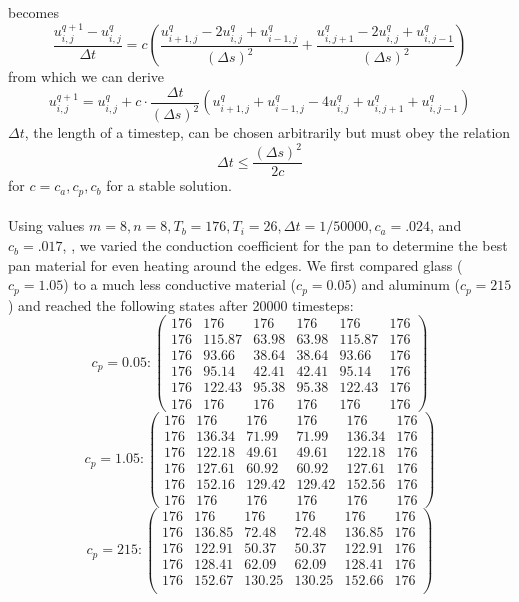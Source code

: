 \documentclass[11pt, fullpage]{article}
\begin{document}
\begin{enumerate}
becomes
\[\dfrac{u_{i,j}^{q+1} - u_{i,j}^q}{\Delta t} = c  \left(\dfrac{u_{i+1,j}^q - 2u_{i,j}^q + u_{i-1,j}^q}{(\Delta s)^2} + \dfrac{u_{i,j+1}^q - 2u_{i,j}^q + u_{i,j-1}^q}{(\Delta s)^2}\right)\]
from which we can derive
\[u_{i,j}^{q+1} = u_{i,j}^q + c \cdot \frac{\Delta t}{(\Delta s)^2} \left(u_{i+1,j}^q + u_{i-1,j}^q - 4u_{i,j}^q + u_{i,j+1}^q + u_{i,j-1}^q \right)\]
$\Delta t$, the length of a timestep, can be chosen arbitrarily but must obey the relation
\[\Delta t \leq \frac{(\Delta s)^2}{2c}\]
for $c = c_a,c_p,c_b$ for a stable solution.\\
\\
Using values $m = 8, n=8, T_b = 176, T_i = 26, \Delta t = 1/50000, c_a = .024$, and $c_b = .017$, , we varied the conduction coefficient for the pan to determine the best pan material for even heating around the edges.  We first compared glass ($c_p = 1.05$) to a much less conductive material ($c_p = 0.05$) and aluminum ($c_p = 215$) and reached the following states after 20000 timesteps:
\[c_p = 0.05: \begin{pmatrix} 176&176&176&176&176&176\\
						176&115.87&63.98&63.98&115.87&176\\
						176&93.66&38.64&38.64&93.66&176\\
						176&95.14&42.41&42.41&95.14&176\\
						176&122.43&95.38&95.38&122.43&176\\
					        176&176&176&176&176&176 \end{pmatrix}\] 
\[c_p = 1.05: \begin{pmatrix} 176&176&176&176&176&176\\
						176&136.34&71.99&71.99&136.34&176\\
						176&122.18&49.61&49.61&122.18&176\\
						176&127.61&60.92&60.92&127.61&176\\
						176&152.16&129.42&129.42&152.56&176\\
					        176&176&176&176&176&176 \end{pmatrix}\]
\[c_p = 215: \begin{pmatrix} 176&176&176&176&176&176\\
						176&136.85&72.48&72.48&136.85&176\\
						176&122.91&50.37&50.37&122.91&176\\
						176&128.41&62.09&62.09&128.41&176\\
						176&152.67&130.25&130.25&152.66&176\\

\end{pmatrix}\]
\end{enumerate}
\end{document}
